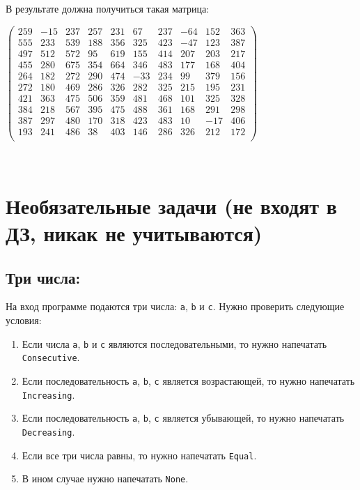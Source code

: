 \documentclass[10pt]{article}
\begin{document}
В результате должна получиться такая матрица:
\begin{center}
$
\begin{pmatrix}
259 & -15 & 237 & 257 &  231 &  67  & 237  & -64  & 152  & 363 \\
555 & 233 & 539 & 188 &  356 &  325 &  423 &  -47 &  123 &  387 \\
497 & 512 & 572 & 95  & 619  & 155  & 414  & 207  & 203  & 217 \\
455 & 280 & 675 & 354 &  664 &  346 &  483 &  177 &  168 &  404 \\
264 & 182 & 272 & 290 &  474 &  -33 &  234 &  99  & 379  & 156 \\
272 & 180 & 469 & 286 &  326 &  282 &  325 &  215 &  195 &  231 \\
421 & 363 & 475 & 506 &  359 &  481 &  468 &  101 &  325 &  328 \\
384 & 218 & 567 & 395 &  475 &  488 &  361 &  168 &  291 &  298 \\
387 & 297 & 480 & 170 &  318 &  423 &  483 &  10  & -17  & 406 \\
193 & 241 & 486 & 38  & 403  & 146  & 286  & 326  & 212  & 172 \\
\end{pmatrix}
$
\end{center}










\newpage
~
\newpage
\section*{Необязательные задачи (не входят в ДЗ, никак не учитываются)}
\setcounter{subsection}{0}

\subsection{Три числа:}
На вход программе подаются три числа: \texttt{a}, \texttt{b} и \texttt{c}. Нужно проверить следующие условия:
\begin{enumerate}
\item Если числа \texttt{a}, \texttt{b} и \texttt{c} являются последовательными, то нужно напечатать \texttt{Consecutive}.
\item Если последовательность \texttt{a}, \texttt{b}, \texttt{c} является возрастающей, то нужно напечатать \texttt{Increasing}.
\item Если последовательность \texttt{a}, \texttt{b}, \texttt{c} является убывающей, то нужно напечатать \texttt{Decreasing}.
\item Если все три числа равны, то нужно напечатать \texttt{Equal}.
\item В ином случае нужно напечатать \texttt{None}.
\end{enumerate}
\end{document}
